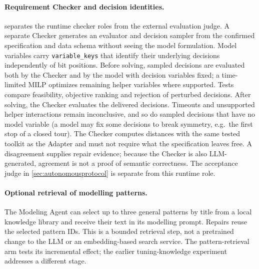 \paragraph{Requirement Checker and decision identities.}
 separates the runtime checker roles from the external evaluation judge.
A separate Checker generates an evaluator and decision sampler from the confirmed specification and data
schema without seeing the model formulation. Model variables carry \texttt{variable\_keys} that identify their
underlying decisions independently of bit positions. Before solving, sampled decisions are evaluated both by
the Checker and by the model with decision variables fixed; a time-limited MILP optimizes remaining helper
variables where supported. Tests compare feasibility, objective ranking and rejection of perturbed decisions.
After solving, the Checker evaluates the delivered decisions. Timeouts and unsupported helper interactions
remain inconclusive, and so do sampled decisions that have no model variable (a model may fix some decisions to
break symmetry, e.g.\ the first stop of a closed tour). The Checker computes distances with the same tested
toolkit as the Adapter and must not require what the specification leaves free. A disagreement supplies repair evidence; because the Checker is also LLM-generated,
agreement is not a proof of semantic correctness. The acceptance judge in \cref{sec:autonomousprotocol} is
separate from this runtime role.



\paragraph{Optional retrieval of modelling patterns.}
The Modeling Agent can select up to three general patterns by title from a local knowledge library and receive
their text in its modelling prompt. Repairs reuse the selected pattern IDs. This is a bounded retrieval step,
not a pretrained change to the LLM or an embedding-based search service. The pattern-retrieval arm tests its
incremental effect; the earlier tuning-knowledge experiment addresses a different stage.


